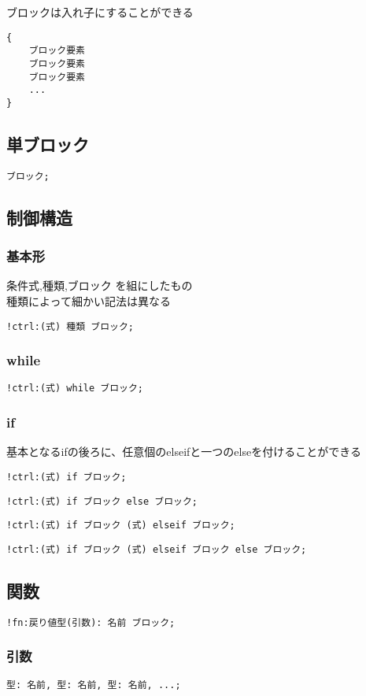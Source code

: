 ブロックは入れ子にすることができる

\begin{lstlisting}[]
{
    ブロック要素
    ブロック要素
    ブロック要素
    ...
}
\end{lstlisting}

\subsection{単ブロック}
\begin{lstlisting}[]
ブロック;
\end{lstlisting}

\subsection{制御構造}
\subsubsection{基本形}
条件式,種類,ブロック を組にしたもの\\
種類によって細かい記法は異なる
\begin{lstlisting}[]
!ctrl:(式) 種類 ブロック;
\end{lstlisting}
\subsubsection{while}
\begin{lstlisting}[]
!ctrl:(式) while ブロック;
\end{lstlisting}
\subsubsection{if}
基本となるifの後ろに、任意個のelseifと一つのelseを付けることができる
\begin{lstlisting}[]
!ctrl:(式) if ブロック;
\end{lstlisting}
\begin{lstlisting}[]
!ctrl:(式) if ブロック else ブロック;
\end{lstlisting}
\begin{lstlisting}[]
!ctrl:(式) if ブロック (式) elseif ブロック;
\end{lstlisting}
\begin{lstlisting}[]
!ctrl:(式) if ブロック (式) elseif ブロック else ブロック;
\end{lstlisting}

\subsection{関数}

\begin{lstlisting}[]
!fn:戻り値型(引数): 名前 ブロック;
\end{lstlisting}

\subsubsection{引数}
\begin{lstlisting}[]
型: 名前, 型: 名前, 型: 名前, ...;
\end{lstlisting}